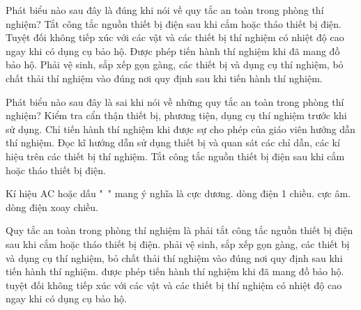 \begin{ex}
Phát biểu nào sau đây là đúng khi nói về quy tắc an toàn trong phòng thí nghiệm?
\choice
{Tắt công tắc nguồn thiết bị điện sau khi cắm hoặc tháo thiết bị điện.}
{Tuyệt đối không tiếp xúc với các vật và các thiết bị thí nghiệm có nhiệt độ cao ngay khi có dụng cụ bảo hộ.}
{Được phép tiến hành thí nghiệm khi đã mang đồ bảo hộ.}
{\True Phải vệ sinh, sắp xếp gọn gàng, các thiết bị và dụng cụ thí nghiệm, bỏ chất thải thí nghiệm vào đúng nơi quy định sau khi tiến hành thí nghiệm.}
\end{ex}

\begin{ex}
Phát biểu nào sau đây là sai khi nói về những quy tắc an toàn trong phòng thí nghiệm?
\choice
{Kiểm tra cẩn thận thiết bị, phương tiện, dụng cụ thí nghiệm trước khi sử dụng.}
{Chỉ tiến hành thí nghiệm khi được sự cho phép của giáo viên hướng dẫn thí nghiệm.}
{Đọc kĩ hướng dẫn sử dụng thiết bị và quan sát các chỉ dẫn, các kí hiệu trên các thiết bị thí nghiệm.}
{\True Tắt công tắc nguồn thiết bị điện sau khi cắm hoặc tháo thiết bị điện.}
\end{ex}

\begin{ex}
Kí hiệu AC hoặc dấu "~" mang ý nghĩa là
\choice
{cực dương.}
{dòng điện 1 chiều.}
{cực âm.}
{\True dòng điện xoay chiều.}
\end{ex}

\begin{ex}
Quy tắc an toàn trong phòng thí nghiệm là phải
\choice
{tắt công tắc nguồn thiết bị điện sau khi cắm hoặc tháo thiết bị điện.}
{\True phải vệ sinh, sắp xếp gọn gàng, các thiết bị và dụng cụ thí nghiệm, bỏ chất thải thí nghiệm vào đúng nơi quy định sau khi tiến hành thí nghiệm.}
{được phép tiến hành thí nghiệm khi đã mang đồ bảo hộ.}
{tuyệt đối không tiếp xúc với các vật và các thiết bị thí nghiệm có nhiệt độ cao ngay khi có dụng cụ bảo hộ.}
\end{ex}


